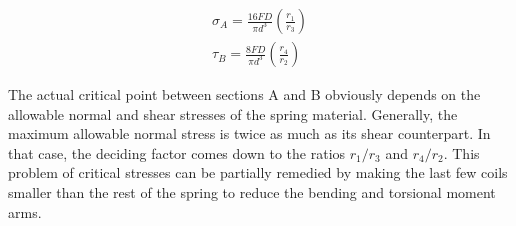 \documentclass[
10pt,
a4paper,
openany,
svgnames,
]{book}
\begin{document}
\begin{equation}
  \label{eqn: critical stresses in end hook extension springs}
  \begin{gathered}
    \sigma_A = \frac{16FD}{\pi d^3}\left( \frac{r_1}{r_3} \right) \\ 
    \tau_B = \frac{8FD}{\pi d^3}\left( \frac{r_4}{r_2} \right)
  \end{gathered}
\end{equation}

The actual critical point between sections A and B obviously depends on the allowable normal and shear stresses of the spring material. Generally, the maximum allowable normal stress is twice as much as its shear counterpart. In that case, the deciding factor comes down to the ratios $r_1 / r_3$ and $r_4 / r_2$. 
This problem of critical stresses can be partially remedied by making the last few coils smaller than the rest of the spring to reduce the bending and torsional moment arms.
\end{document}
